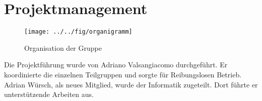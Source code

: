 \section{Projektmanagement}

\begin{figure}[h!]
	\centering
	\texttt{[image: ../../fig/organigramm]}
	\caption{Organisation der Gruppe}
	\label{fig:Organigramm}
\end{figure}

\noindent
Die Projektführung wurde von Adriano Valsangiacomo durchgeführt. Er koordinierte die einzelnen Teilgruppen und sorgte für Reibungslosen Betrieb. Adrian Würsch, als neues Mitglied, wurde der Informatik zugeteilt. Dort führte er unterstützende Arbeiten aus.


\newpage

\newpage

\newpage